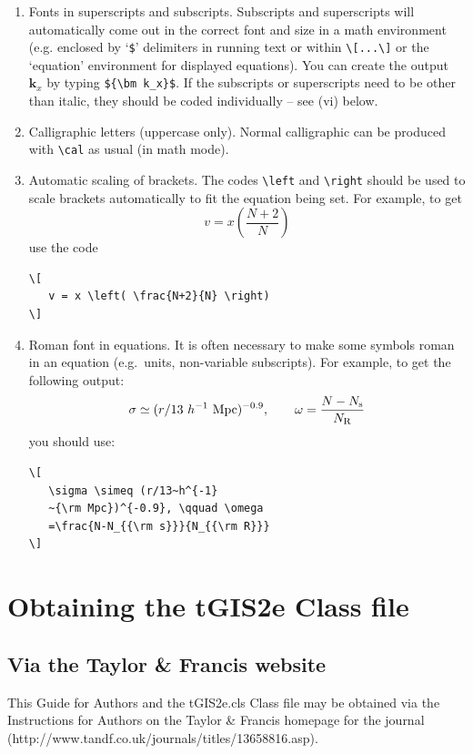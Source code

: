 \documentclass[]{tGIS2e}
\begin{document}
\begin{enumerate}
\item[(iii)] Fonts in superscripts and subscripts. Subscripts and superscripts will automatically come  out in the correct font
and size in a math environment (e.g. enclosed by `\verb"$"'
delimiters in running text or within \verb"\[...\]" or the
`equation' environment for displayed equations). You can create
the output ${\bm k_x}$ by typing \verb"${\bm k_x}$". If the
subscripts or superscripts need to be other than italic, they
should be coded individually -- see (vi) below.

\item[(iv)] Calligraphic letters (uppercase only).
%
%
Normal calligraphic can be produced with \verb"\cal" as usual (in
math mode).

\item[(v)] Automatic scaling of brackets. The codes \verb"\left" and
\verb"\right" should  be used to scale brackets automatically to
fit the equation being set. For example, to get
\[
   v = x \left( \frac{N+2}{N} \right)
\]
use the code
%
\begin{verbatim}
\[
   v = x \left( \frac{N+2}{N} \right)
\]
\end{verbatim}

\item[(vi)] Roman font in equations. It is often necessary to make some
symbols roman in an equation (e.g.\ units, non-variable
subscripts). For example, to get the following output:
\[
   \sigma \simeq (r/13~h^{-1}~{\rm Mpc})^{-0.9},
   \qquad \omega = \frac{N-N_{\rm s}}{N_{\rm R}}
\]
\noindent you should use:
%
\begin{verbatim}
\[
   \sigma \simeq (r/13~h^{-1}
   ~{\rm Mpc})^{-0.9}, \qquad \omega
   =\frac{N-N_{{\rm s}}}{N_{{\rm R}}}
\]
\end{verbatim}
\end{enumerate}

\section{Obtaining the tGIS2e Class file}\label{FTP}

\subsection{Via the Taylor \& Francis website}

\noindent This Guide for Authors and the tGIS2e.cls Class file may be obtained via the Instructions for Authors
on the Taylor \& Francis homepage for the journal (http://www.tandf.co.uk/journals/titles/13658816.asp).
\end{document}

